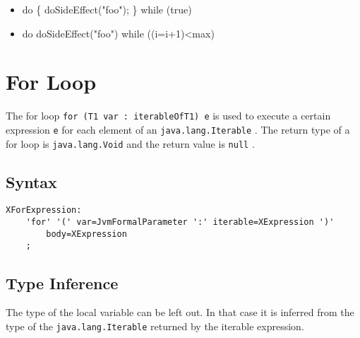 \documentclass[a4paper,10pt]{scrreprt}
\newlength{\itemindentlen}
\begin{document}
\setlength{\itemindentlen}{\textwidth}
\begin{itemize}
\addtolength{\itemindentlen}{-2em}

\item \begin{minipage}[t]{\itemindentlen}

	do \{
		doSideEffect("foo");
	\} while (true)
	
\end{minipage}

\item \begin{minipage}[t]{\itemindentlen}

	do doSideEffect("foo") while ((i=i+1)<max)
	
\end{minipage}

\end{itemize}
\addtolength{\itemindentlen}{2em}







\section{For Loop}
\label{ForLoop}
The for loop \lstinline{for (T1 var : iterableOfT1) e}
 is used to execute a certain expression \lstinline{e}
 for each element of an \lstinline{java.lang.Iterable}
.
The return type of a for loop is \lstinline{java.lang.Void}
 and the return value is \lstinline{null}
.

\subsection{Syntax}

\begin{lstlisting}
XForExpression:
	'for' '(' var=JvmFormalParameter ':' iterable=XExpression ')' 
		body=XExpression
	;

\end{lstlisting}
 




\subsection{Type Inference}

The type of the local variable can be left out. In that case it is inferred from the type of the \lstinline{java.lang.Iterable}
 returned by the iterable expression.
\end{document}
